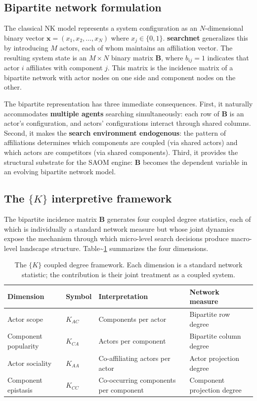 \documentclass[
]{article}
\begin{document}
\subsection{Bipartite network formulation}\label{sec:bipartite}

The classical NK model represents a system configuration as an
\(N\)-dimensional binary vector \(\mathbf{x} = (x_1, x_2, \ldots, x_N)\)
where \(x_j \in \{0, 1\}\). \textbf{searchnet} generalizes this by
introducing \(M\) actors, each of whom maintains an affiliation vector.
The resulting system state is an \(M \times N\) binary matrix
\(\mathbf{B}\), where \(b_{ij} = 1\) indicates that actor \(i\)
affiliates with component \(j\). This matrix is the incidence matrix of
a bipartite network with actor nodes on one side and component nodes on
the other.

The bipartite representation has three immediate consequences. First, it
naturally accommodates \textbf{multiple agents} searching
simultaneously: each row of \(\mathbf{B}\) is an actor's configuration,
and actors' configurations interact through shared columns. Second, it
makes the \textbf{search environment endogenous}: the pattern of
affiliations determines which components are coupled (via shared actors)
and which actors are competitors (via shared components). Third, it
provides the structural substrate for the SAOM engine: \(\mathbf{B}\)
becomes the dependent variable in an evolving bipartite network model.

\subsection{\texorpdfstring{The \(\{K\}\) interpretive
framework}{The \textbackslash\{K\textbackslash\} interpretive framework}}\label{sec:k4}

The bipartite incidence matrix \(\mathbf{B}\) generates four coupled
degree statistics, each of which is individually a standard network
measure but whose joint dynamics expose the mechanism through which
micro-level search decisions produce macro-level landscape structure.
Table\textasciitilde{}\ref{tab:k4} summarizes the four dimensions.

\begin{table}[t]
\centering
\caption{The $\{K\}$ coupled degree framework.  Each dimension is a standard
network statistic; the contribution is their joint treatment as a coupled
system.}
\label{tab:k4}
\begin{tabular}{llll}
\toprule
Dimension & Symbol & Interpretation & Network measure \\
\midrule
Actor scope & $K_{AC}$ & Components per actor & Bipartite row degree \\
Component popularity & $K_{CA}$ & Actors per component & Bipartite column degree \\
Actor sociality & $K_{AA}$ & Co-affiliating actors per actor & Actor projection degree \\
Component epistasis & $K_{CC}$ & Co-occurring components per component & Component projection degree \\
\bottomrule
\end{tabular}
\end{table}
\end{document}
